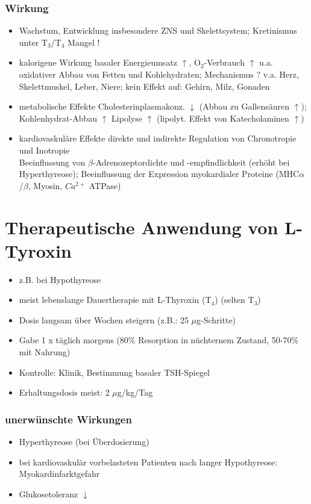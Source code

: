 \documentclass[10pt,a4paper]{report}
\begin{document}
\subsubsection{Wirkung} %
\label{par:wirkung}
\begin{itemize}
	\item Wachstum, Entwicklung
	insbesondere ZNS und Skelettsystem; Kretinismus unter T$_3$/T$_4$ Mangel !
	\item kalorigene Wirkung
	basaler Energieumsatz $\uparrow$, O$_2$-Verbrauch $\uparrow$ 
	u.a. oxidativer Abbau von Fetten und Kohlehydraten; Mechanismus ?
	v.a. Herz, Skelettmuskel, Leber, Niere; kein Effekt auf: Gehirn, Milz, Gonaden
	\item metabolische Effekte
	Cholesterinplasmakonz. $\downarrow$ (Abbau zu Gallensäuren $\uparrow$); Kohlenhydrat-Abbau $\uparrow$
	Lipolyse $\uparrow$ (lipolyt. Effekt von Katecholaminen $\uparrow$)
	\item kardiovaskuläre Effekte
	direkte und indirekte Regulation von Chronotropie und Inotropie\\
	Beeinflussung von $\beta$-Adrenozeptordichte und -empfindlichkeit
	(erhöht bei Hyperthyreose); Beeinflussung der Expression myokardialer 
	Proteine (MHC$\alpha$/$\beta$, Myosin, $Ca^{2+}$ ATPase)
\end{itemize}
\section{Therapeutische Anwendung von L-Tyroxin} %
\label{sec:therapeutische_anwendung_von_l_tyroxin}
\begin{itemize}
	\item z.B. bei Hypothyreose
	\item meist lebenslange Dauertherapie mit L-Thyroxin (T$_4$) (selten T$_3$)
	\item Dosis langsam über Wochen steigern (z.B.: 25 $\mu$g-Schritte)
	\item Gabe 1 x täglich morgens  (80\% Resorption in nüchternem Zustand, 50-70\% mit Nahrung)
	\item Kontrolle: Klinik, Bestimmung basaler TSH-Spiegel
	\item Erhaltungsdosis meist: 2 $\mu$g/kg/Tag
\end{itemize}
\subsubsection{unerwünschte Wirkungen} %
\label{par:unerw_nschte_wirkungen}
\begin{itemize}
	\item Hyperthyreose (bei Überdosierung)
	\item bei kardiovaskulär vorbelasteten Patienten nach langer Hypothyreose: Myokardinfarktgefahr
	\item Glukosetoleranz $\downarrow$
\end{itemize}
\end{document}
